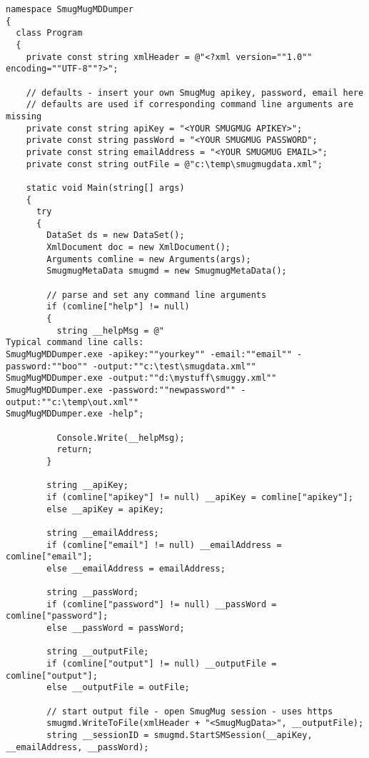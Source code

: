 \begin{tcolorbox}[breakable, size=fbox, boxrule=1pt, pad at break*=1mm,colback=cellbackground, colframe=cellborder]
\lstset{style=sharpc, label=lst:scr323X0}
\begin{lstlisting}
namespace SmugMugMDDumper
{
  class Program
  {
    private const string xmlHeader = @"<?xml version=""1.0"" encoding=""UTF-8""?>";

    // defaults - insert your own SmugMug apikey, password, email here
    // defaults are used if corresponding command line arguments are missing
    private const string apiKey = "<YOUR SMUGMUG APIKEY>";
    private const string passWord = "<YOUR SMUGMUG PASSWORD";
    private const string emailAddress = "<YOUR SMUGMUG EMAIL>";
    private const string outFile = @"c:\temp\smugmugdata.xml";

    static void Main(string[] args)
    {
      try
      {
        DataSet ds = new DataSet();
        XmlDocument doc = new XmlDocument();
        Arguments comline = new Arguments(args);
        SmugmugMetaData smugmd = new SmugmugMetaData();

        // parse and set any command line arguments
        if (comline["help"] != null)
        {
          string __helpMsg = @"
Typical command line calls:
SmugMugMDDumper.exe -apikey:""yourkey"" -email:""email"" -password:""boo"" -output:""c:\test\smugdata.xml""
SmugMugMDDumper.exe -output:""d:\mystuff\smuggy.xml""
SmugMugMDDumper.exe -password:""newpassword"" -output:""c:\temp\out.xml""
SmugMugMDDumper.exe -help";

          Console.Write(__helpMsg);
          return;
        }

        string __apiKey;
        if (comline["apikey"] != null) __apiKey = comline["apikey"];
        else __apiKey = apiKey;

        string __emailAddress;
        if (comline["email"] != null) __emailAddress = comline["email"];
        else __emailAddress = emailAddress;

        string __passWord;
        if (comline["password"] != null) __passWord = comline["password"];
        else __passWord = passWord;

        string __outputFile;
        if (comline["output"] != null) __outputFile = comline["output"];
        else __outputFile = outFile;

        // start output file - open SmugMug session - uses https
        smugmd.WriteToFile(xmlHeader + "<SmugMugData>", __outputFile);
        string __sessionID = smugmd.StartSMSession(__apiKey, __emailAddress, __passWord);


\end{lstlisting}
\end{tcolorbox}
